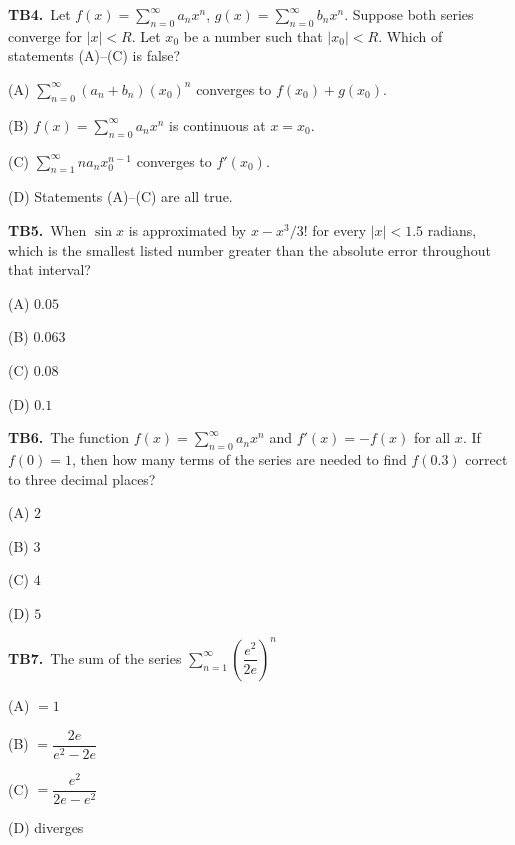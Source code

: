 \documentclass[11pt]{article}
\begin{document}
\bigskip\noindent\textbf{TB4.}\ Let $f(x)=\displaystyle\sum_{n=0}^\infty a_nx^n$, $g(x)=\displaystyle\sum_{n=0}^\infty b_nx^n$. Suppose both series converge for $|x|<R$. Let $x_0$ be a number such that $|x_0|<R$. Which of statements (A)--(C) is false?
\begin{list}{}{\setlength{\leftmargin}{3em}\setlength{\labelwidth}{2.5em}\setlength{\itemsep}{0pt}\setlength{\topsep}{2pt}}
\item[(A)] $\displaystyle\sum_{n=0}^\infty (a_n+b_n)(x_0)^n$ converges to $f(x_0)+g(x_0)$.
\item[(B)] $f(x)=\displaystyle\sum_{n=0}^\infty a_nx^n$ is continuous at $x=x_0$.
\item[(C)] $\displaystyle\sum_{n=1}^\infty na_nx_0^{n-1}$ converges to $f'(x_0)$.
\item[(D)] Statements (A)--(C) are all true.
\end{list}

\bigskip\noindent\textbf{TB5.}\ When $\sin x$ is approximated by $x-x^3/3!$ for every $|x|<1.5$ radians, which is the smallest listed number greater than the absolute error throughout that interval?
\begin{list}{}{\setlength{\leftmargin}{3em}\setlength{\labelwidth}{2.5em}\setlength{\itemsep}{0pt}\setlength{\topsep}{2pt}}
\item[(A)] $0.05$
\item[(B)] $0.063$
\item[(C)] $0.08$
\item[(D)] $0.1$
\end{list}

\bigskip\noindent\textbf{TB6.}\ The function $f(x)=\displaystyle\sum_{n=0}^\infty a_nx^n$ and $f'(x)=-f(x)$ for all $x$. If $f(0)=1$, then how many terms of the series are needed to find $f(0.3)$ correct to three decimal places?
\begin{list}{}{\setlength{\leftmargin}{3em}\setlength{\labelwidth}{2.5em}\setlength{\itemsep}{0pt}\setlength{\topsep}{2pt}}
\item[(A)] $2$
\item[(B)] $3$
\item[(C)] $4$
\item[(D)] $5$
\end{list}

\bigskip\noindent\textbf{TB7.}\ The sum of the series $\displaystyle\sum_{n=1}^\infty \left(\dfrac{e^2}{2e}\right)^n$
\begin{list}{}{\setlength{\leftmargin}{3em}\setlength{\labelwidth}{2.5em}\setlength{\itemsep}{0pt}\setlength{\topsep}{2pt}}
\item[(A)] $=1$
\item[(B)] $=\dfrac{2e}{e^2-2e}$
\item[(C)] $=\dfrac{e^2}{2e-e^2}$
\item[(D)] diverges
\end{list}
\end{document}

